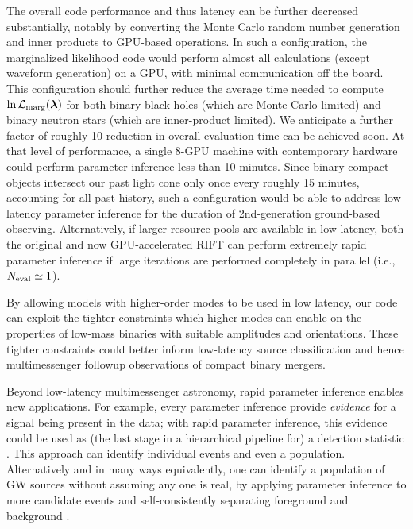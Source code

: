\documentclass[twocolumn,prd,nofootinbib]{revtex4}
\newcommand\editremark[1]{{\color{red} #1}}
\begin{document}
The overall code performance and thus latency can be further decreased substantially, notably by converting the Monte
Carlo random number generation and inner products to GPU-based operations.  In such a configuration, the marginalized
likelihood code would perform almost all calculations (except waveform generation) on a GPU, with minimal communication off
the board.  This configuration should further reduce the average time needed to compute $\ln {\cal L}_{\rm
  marg}(\bm{\lambda})$ for both binary black holes (which are Monte Carlo limited) and binary neutron stars (which are
inner-product limited).   We anticipate a further factor of roughly 10 reduction in overall evaluation time can be
achieved soon.  At that level of performance, a single 8-GPU machine with contemporary hardware could perform parameter inference less than 10
minutes.    Since binary compact objects intersect our past light cone only once every roughly 15 minutes, accounting
for all past history, such a configuration would be able to address low-latency parameter inference for the duration of
2nd-generation ground-based observing.
Alternatively, if larger resource pools are available in low latency, both the original and now GPU-accelerated RIFT  can
perform extremely rapid parameter inference if large iterations are performed completely in parallel (i.e., $N_{\rm
  eval} \simeq 1$).
%

By allowing  models with higher-order modes to be used in low latency, our code can exploit the tighter constraints which higher modes can enable on  the properties of low-mass
binaries with suitable amplitudes and orientations.  These tighter constraints could
better  inform low-latency source classification and hence multimessenger followup observations of compact binary mergers.

Beyond low-latency multimessenger astronomy, rapid parameter inference enables new applications.  For example, every
parameter inference provide \emph{evidence} for a signal being present in the data; with rapid parameter inference, this
evidence could be used as (the last stage in a hierarchical pipeline for) a detection statistic
\cite{2018PhRvX...8b1019S}.    
This approach can identify individual events and
even a population.
Alternatively and in many ways equivalently, one can identify a population of GW sources without assuming any one is
real, by  applying parameter inference to more candidate events and self-consistently separating foreground and
background
\cite{2015PhRvD..91b3005F,2019MNRAS.tmp..230G}.
\end{document}
